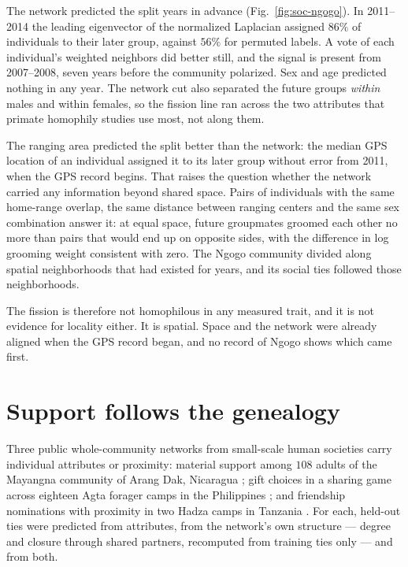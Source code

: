 The network predicted the split years in advance (Fig.~\ref{fig:soc-ngogo}). In
2011--2014 the leading eigenvector of the normalized Laplacian assigned $86\%$ of
individuals to their later group, against $56\%$ for permuted labels. A vote of each
individual's weighted neighbors did better still, and the signal is present from
2007--2008, seven years before the community polarized. Sex and age predicted nothing in
any year. The network cut also separated the future groups \emph{within} males and
within females, so the fission line ran across the two attributes that primate homophily
studies use most, not along them.

The ranging area predicted the split better than the network: the median GPS location of
an individual assigned it to its later group without error from 2011, when the GPS
record begins. That raises the question whether the network carried any information
beyond shared space. Pairs of individuals with the same home-range overlap, the same
distance between ranging centers and the same sex combination answer it: at equal space,
future groupmates groomed each other no more than pairs that would end up on opposite
sides, with the difference in log grooming weight consistent with zero. The Ngogo
community divided along spatial neighborhoods that had existed for years, and its social
ties followed those neighborhoods.

The fission is therefore not homophilous in any measured trait, and it is not evidence
for locality either. It is spatial. Space and the network were already aligned when the
GPS record began, and no record of Ngogo shows which came first.

\section{Support follows the genealogy}

Three public whole-community networks from small-scale human societies carry individual
attributes or proximity: material support among $108$ adults of the Mayangna community of
Arang Dak, Nicaragua \citep{koster2018}; gift choices in a sharing game across eighteen
Agta forager camps in the Philippines \citep{smith2018agta}; and friendship nominations
with proximity in two Hadza camps in Tanzania \citep{fedurek2024}. For each, held-out ties
were predicted from attributes, from the network's own structure --- degree and closure
through shared partners, recomputed from training ties only --- and from both.

